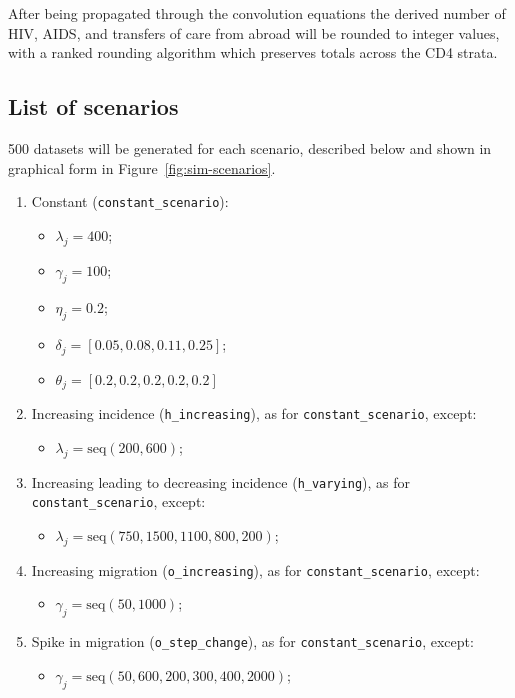 \documentclass[11pt, a4paper]{article}
\begin{document}
After being propagated through the convolution equations the derived number of HIV, AIDS, and transfers of care from abroad will be rounded to integer values, with a ranked rounding algorithm which preserves totals across the CD4 strata.

\subsection{List of scenarios}

500 datasets will be generated for each scenario, described below and shown in graphical form in Figure~\ref{fig:sim-scenarios}.
%
\begin{enumerate}
  \item Constant (\texttt{constant\_scenario}): 
  \begin{itemize}
      \item $\lambda_j = 400$;
      \item $\gamma_j = 100$; 
      \item $\eta_j = 0.2$; 
      \item $\delta_{j} = \left[0.05, 0.08, 0.11, 0.25\right]$;
      \item $\theta_{j} = \left[0.2, 0.2, 0.2, 0.2, 0.2\right]$
  \end{itemize}

  \item Increasing incidence (\texttt{h\_increasing}), as for \texttt{constant\_scenario}, except:
  \begin{itemize}
      \item $\lambda_j = \text{seq}(200, 600)$;
  \end{itemize}

  \item Increasing leading to decreasing incidence (\texttt{h\_varying}), as for \texttt{constant\_scenario}, except:
  \begin{itemize}
      \item $\lambda_j = \text{seq}(750, 1500, 1100, 800, 200)$;
  \end{itemize}

  \item Increasing migration (\texttt{o\_increasing}), as for \texttt{constant\_scenario}, except:
  \begin{itemize}
      \item $\gamma_j = \text{seq}(50, 1000)$;
  \end{itemize}

  \item Spike in migration (\texttt{o\_step\_change}), as for \texttt{constant\_scenario}, except:
  \begin{itemize}
      \item $\gamma_j = \text{seq}(50, 600, 200, 300, 400, 2000)$;
  \end{itemize}


\end{enumerate}
\end{document}
